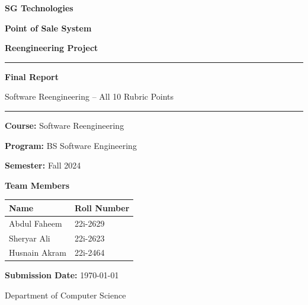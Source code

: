 \documentclass[12pt,a4paper]{report}
\begin{document}
\begin{titlepage}
  \centering
  \vspace*{1.5cm}

  {\Huge\bfseries SG Technologies\par}
  \vspace{0.5cm}
  {\LARGE\bfseries Point of Sale System\par}
  \vspace{0.3cm}
  {\LARGE\bfseries Reengineering Project\par}

  \vspace{1.5cm}

  \rule{\textwidth}{1.5pt}
  \vspace{0.5cm}
  {\Large\bfseries Final Report\par}
  \vspace{0.3cm}
  {\large Software Reengineering -- All 10 Rubric Points\par}
  \rule{\textwidth}{1.5pt}

  \vspace{2cm}

  {\bfseries Course:} Software Reengineering\par
  \vspace{0.3cm}
  {\bfseries Program:} BS Software Engineering\par
  \vspace{0.3cm}
  {\bfseries Semester:} Fall 2024\par

  \vspace{2cm}

  {\Large\bfseries Team Members\par}
  \vspace{0.5cm}
  \begin{tabular}{l l}
    \toprule
    \textbf{Name} & \textbf{Roll Number} \\
    \midrule
    Abdul Faheem  & 22i-2629 \\
    Sheryar Ali   & 22i-2623 \\
    Husnain Akram & 22i-2464 \\
    \bottomrule
  \end{tabular}

  \vfill

  {\bfseries Submission Date:} \today\par
  \vspace{0.5cm}
  {\small Department of Computer Science\par}

  \vspace*{1cm}
\end{titlepage}
\end{document}
